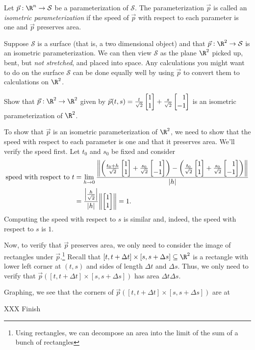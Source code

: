 \begin{definition}
	Let $\vec p:\R^n\to\mathcal S$ be a parameterization of $\mathcal S$.  The parameterization
	$\vec p$ is called an \emph{isometric parameterization} if the speed of $\vec p$ with
	respect to each parameter is one and $\vec p$ preserves area.
\end{definition}

Suppose $\mathcal S$ is a surface (that is, a two dimensional object) and that $\vec p:\R^2\to\mathcal S$
is an isometric parameterization.  We can then view $\mathcal S$ as the plane $\R^2$ picked up, bent, 
but \emph{not stretched}, and placed into space.  Any calculations you might want to do on 
the surface $\mathcal S$ can be done equally well by using $\vec p$ to convert them to calculations
on $\R^2$.

\begin{example}
	Show that $\vec p:\R^2\to\R^2$ given by $\vec p(t,s)=\tfrac{t}{\sqrt{2}}\mat{1\\1}+\tfrac{s}{\sqrt{2}}\mat{1\\-1}$
	is an isometric parameterization of $\R^2$.

	To show that $\vec p$ is an isometric parameterization of $\R^2$, we need to show that the speed with respect
	to each parameter is one and that it preserves area.  We'll verify the speed first.
	Let $t_0$ and $s_0$ be fixed and consider
	\begin{align*}
		\text{speed with respect to $t$} &= \lim_{h\to 0} 
		\frac{\norm*{\left(\tfrac{t_0+h}{\sqrt{2}} \mat{1\\1} + \tfrac{s_0}{\sqrt{2}}\mat{1\\-1}\right)
		-\left(\tfrac{t_0}{\sqrt{2}} \mat{1\\1} + \tfrac{s_0}{\sqrt{2}}\mat{1\\-1}\right)}
		}{\abs{h}}\\
		&= \frac{\abs*{\tfrac{h}{\sqrt{2}}}}{\abs{h}}\norm*{\mat{1\\1}} = 1.
	\end{align*}
	Computing the speed with respect to $s$ is similar and, indeed, the speed with
	respect to $s$ is $1$.

	Now, to verify that $\vec p$ preserves area, we only need to consider the image
	of rectangles under $\vec p$.\footnote{
		Using rectangles, we can decompose an area into the limit of the sum of a bunch of
		rectangles}
	Recall that $[t,t+\Delta t]\times[s,s+\Delta s]\subseteq\R^2$ is a rectangle with 
	lower left corner at $(t,s)$ and sides of length $\Delta t$ and $\Delta s$.
	Thus, we only need to verify
	that $\vec p([t,t+\Delta t]\times[s,s+\Delta s])$ has area $\Delta t\Delta s$.

	Graphing, we see that the corners of $\vec p([t,t+\Delta t]\times[s,s+\Delta s])$ are at

	XXX Finish
\end{example}

